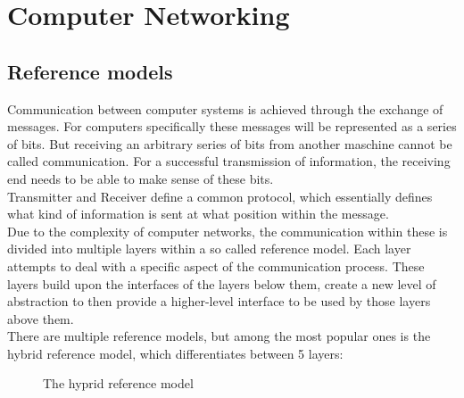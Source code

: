 \section{Computer Networking}

\subsection{Reference models}

Communication between computer systems is achieved through the exchange of messages. For computers specifically these messages will be represented as a series of bits. But receiving an arbitrary series of bits from another maschine cannot be called communication. For a successful transmission of information, the receiving end needs to be able to make sense of these bits.\\
Transmitter and Receiver define a common protocol, which essentially defines what kind of information is sent at what position within the message.\\
Due to the complexity of computer networks, the communication within these is divided into multiple layers within a so called reference model. Each layer attempts to deal with a specific aspect of the communication process. These layers build upon the interfaces of the layers below them, create a new level of abstraction to then provide a higher-level interface to be used by those layers above them.\\
There are multiple reference models, but among the most popular ones is the hybrid reference model, which differentiates between 5 layers:\cite{ComputerNetworks}
\setlength{\fboxsep}{10pt}%
\setlength{\fboxrule}{0pt}%
\begin{figure}[h]
\centering
{}
\caption[The hybrid reference model]{The hyprid reference model}
\end{figure}

